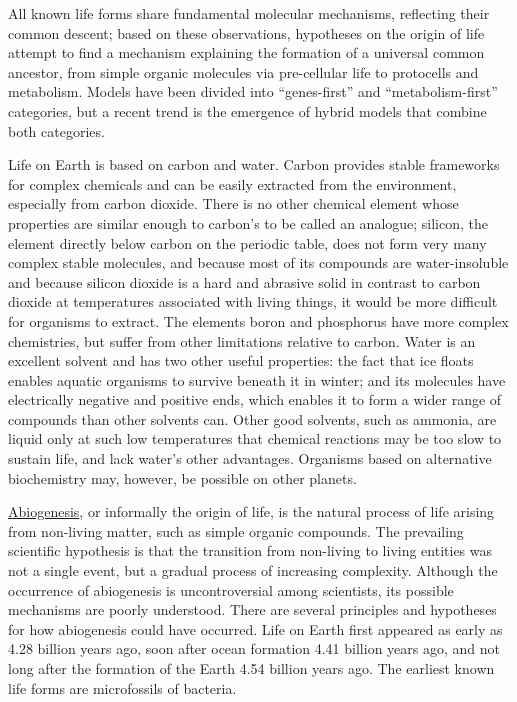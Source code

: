 \documentclass[
]{article}
\begin{document}
All known life forms share fundamental molecular mechanisms, reflecting
their common descent; based on these observations, hypotheses on the
origin of life attempt to find a mechanism explaining the formation of a
universal common ancestor, from simple organic molecules via
pre-cellular life to protocells and metabolism. Models have been divided
into ``genes-first'' and ``metabolism-first'' categories, but a recent
trend is the emergence of hybrid models that combine both categories.

Life on Earth is based on carbon and water. Carbon provides stable
frameworks for complex chemicals and can be easily extracted from the
environment, especially from carbon dioxide. There is no other chemical
element whose properties are similar enough to carbon's to be called an
analogue; silicon, the element directly below carbon on the periodic
table, does not form very many complex stable molecules, and because
most of its compounds are water-insoluble and because silicon dioxide is
a hard and abrasive solid in contrast to carbon dioxide at temperatures
associated with living things, it would be more difficult for organisms
to extract. The elements boron and phosphorus have more complex
chemistries, but suffer from other limitations relative to carbon. Water
is an excellent solvent and has two other useful properties: the fact
that ice floats enables aquatic organisms to survive beneath it in
winter; and its molecules have electrically negative and positive ends,
which enables it to form a wider range of compounds than other solvents
can. Other good solvents, such as ammonia, are liquid only at such low
temperatures that chemical reactions may be too slow to sustain life,
and lack water's other advantages. Organisms based on alternative
biochemistry may, however, be possible on other planets.

\href{https://en.wikipedia.org/wiki/Abiogenesis}{Abiogenesis}, or
informally the origin of life, is the natural process of life arising
from non-living matter, such as simple organic compounds. The prevailing
scientific hypothesis is that the transition from non-living to living
entities was not a single event, but a gradual process of increasing
complexity. Although the occurrence of abiogenesis is uncontroversial
among scientists, its possible mechanisms are poorly understood. There
are several principles and hypotheses for how abiogenesis could have
occurred. Life on Earth first appeared as early as 4.28 billion years
ago, soon after ocean formation 4.41 billion years ago, and not long
after the formation of the Earth 4.54 billion years ago. The earliest
known life forms are microfossils of bacteria.
\end{document}
